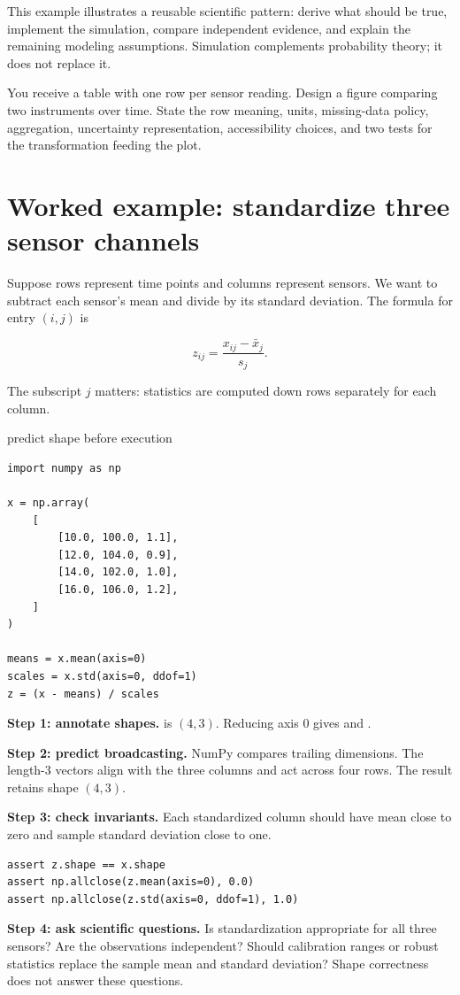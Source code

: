 This example illustrates a reusable scientific pattern: derive what should be
true, implement the simulation, compare independent evidence, and explain the
remaining modeling assumptions. Simulation complements probability theory; it
does not replace it.

\begin{checkpointbox}
You receive a table with one row per sensor reading. Design a figure comparing
two instruments over time. State the row meaning, units, missing-data policy,
aggregation, uncertainty representation, accessibility choices, and two tests
for the transformation feeding the plot.
\end{checkpointbox}

\section{Worked example: standardize three sensor channels}

Suppose rows represent time points and columns represent sensors. We want to
subtract each sensor's mean and divide by its standard deviation. The formula
for entry $(i,j)$ is

\[
  z_{ij}=\frac{x_{ij}-\bar{x}_j}{s_j}.
\]

The subscript $j$ matters: statistics are computed down rows separately for
each column.

\begin{workedexample}{predict shape before execution}
\begin{lstlisting}
import numpy as np

x = np.array(
    [
        [10.0, 100.0, 1.1],
        [12.0, 104.0, 0.9],
        [14.0, 102.0, 1.0],
        [16.0, 106.0, 1.2],
    ]
)

means = x.mean(axis=0)
scales = x.std(axis=0, ddof=1)
z = (x - means) / scales
\end{lstlisting}

\textbf{Step 1: annotate shapes.}  is $(4,3)$. Reducing axis 0
gives  and .

\textbf{Step 2: predict broadcasting.} NumPy compares trailing dimensions.
The length-3 vectors align with the three columns and act across four rows.
The result retains shape $(4,3)$.

\textbf{Step 3: check invariants.} Each standardized column should have mean
close to zero and sample standard deviation close to one.

\begin{lstlisting}
assert z.shape == x.shape
assert np.allclose(z.mean(axis=0), 0.0)
assert np.allclose(z.std(axis=0, ddof=1), 1.0)
\end{lstlisting}

\textbf{Step 4: ask scientific questions.} Is standardization appropriate for
all three sensors? Are the observations independent? Should calibration ranges
or robust statistics replace the sample mean and standard deviation? Shape
correctness does not answer these questions.
\end{workedexample}

